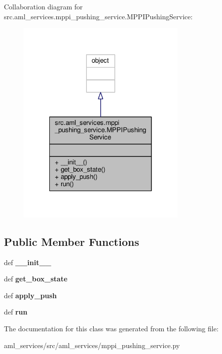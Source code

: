 Collaboration diagram for src.\-aml\-\_\-services.\-mppi\-\_\-pushing\-\_\-service.\-M\-P\-P\-I\-Pushing\-Service\-:
\nopagebreak
\begin{figure}[H]
\begin{center}
\leavevmode
\includegraphics[width=234pt]{classsrc_1_1aml__services_1_1mppi__pushing__service_1_1_m_p_p_i_pushing_service__coll__graph}
\end{center}
\end{figure}
\subsection*{Public Member Functions}
\begin{DoxyCompactItemize}
\item 
\hypertarget{classsrc_1_1aml__services_1_1mppi__pushing__service_1_1_m_p_p_i_pushing_service_a64a6e9a835bacadc2f0b7e5f71d9499b}{def {\bfseries \-\_\-\-\_\-init\-\_\-\-\_\-}}\label{classsrc_1_1aml__services_1_1mppi__pushing__service_1_1_m_p_p_i_pushing_service_a64a6e9a835bacadc2f0b7e5f71d9499b}

\item 
\hypertarget{classsrc_1_1aml__services_1_1mppi__pushing__service_1_1_m_p_p_i_pushing_service_aba3fff172cd17d88054c25692b3342db}{def {\bfseries get\-\_\-box\-\_\-state}}\label{classsrc_1_1aml__services_1_1mppi__pushing__service_1_1_m_p_p_i_pushing_service_aba3fff172cd17d88054c25692b3342db}

\item 
\hypertarget{classsrc_1_1aml__services_1_1mppi__pushing__service_1_1_m_p_p_i_pushing_service_a65c5883ef22d9591b2ce076facf1bf1b}{def {\bfseries apply\-\_\-push}}\label{classsrc_1_1aml__services_1_1mppi__pushing__service_1_1_m_p_p_i_pushing_service_a65c5883ef22d9591b2ce076facf1bf1b}

\item 
\hypertarget{classsrc_1_1aml__services_1_1mppi__pushing__service_1_1_m_p_p_i_pushing_service_a626d4c8d2c9cb0f1efe1c645ae5a902d}{def {\bfseries run}}\label{classsrc_1_1aml__services_1_1mppi__pushing__service_1_1_m_p_p_i_pushing_service_a626d4c8d2c9cb0f1efe1c645ae5a902d}

\end{DoxyCompactItemize}


The documentation for this class was generated from the following file\-:\begin{DoxyCompactItemize}
\item 
aml\-\_\-services/src/aml\-\_\-services/mppi\-\_\-pushing\-\_\-service.\-py\end{DoxyCompactItemize}

